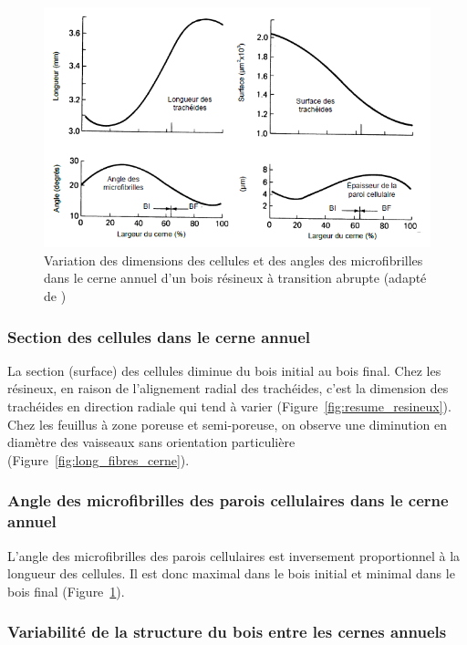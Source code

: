 \begin{figure}[h]
	\centering
	\includegraphics[scale=0.7]{img/ch7_long_mfa_cerne}
	\caption{Variation des dimensions des cellules et des angles des microfibrilles dans le cerne annuel d'un bois résineux à transition abrupte (adapté de \cite{panshin1980textbook})}
	\label{fig:long_mfa_cerne}
\end{figure} 


\subsubsection{Section des cellules dans le cerne annuel}

La section (surface) des cellules diminue du bois initial au bois final. Chez les résineux, en raison de l'alignement radial des trachéides, c'est la dimension des trachéides en direction radiale qui tend à varier (Figure~\ref{fig:resume_resineux}). Chez les feuillus à zone poreuse et semi-poreuse, on observe une diminution en diamètre des vaisseaux sans orientation particulière (Figure~\ref{fig:long_fibres_cerne}).

\subsubsection{Angle des microfibrilles des parois cellulaires dans le cerne annuel}

L'angle des microfibrilles des parois cellulaires est inversement proportionnel à la longueur des cellules. Il est donc maximal dans le bois initial et minimal dans le bois final (Figure~\ref{fig:long_mfa_cerne}).

\subsubsection{Variabilité de la structure du bois entre les cernes annuels}

